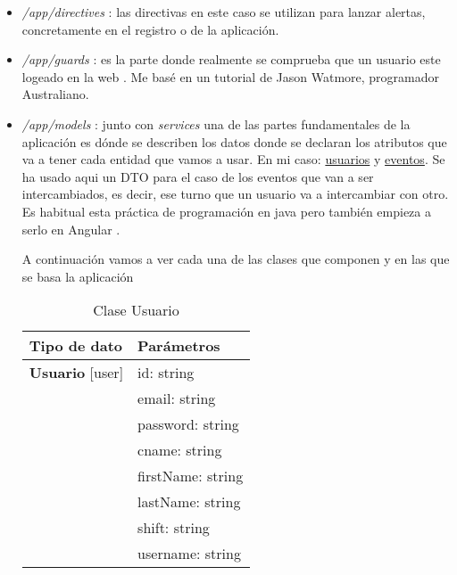 \begin{itemize}

	\item \emph{/app/directives} : las directivas  en este caso se utilizan para lanzar alertas, concretamente en el registro o  de la aplicación. 
	
	\item \emph{/app/guards} : es la parte donde realmente se comprueba que un usuario este logeado en la web \cite{guards}. Me basé en un tutorial \cite{logintut} de Jason Watmore, programador Australiano. 
	
	\item \emph{/app/models} : junto con \emph{services} una de las partes fundamentales de la aplicación es dónde se describen los datos donde se declaran los atributos que va a tener cada entidad que vamos a usar. En mi caso: \underline{usuarios} y \underline{eventos}.  
	Se ha usado aqui un DTO \cite{dto} para el caso de los eventos que van a ser intercambiados, es decir, ese turno que un usuario va a intercambiar con otro. Es habitual esta práctica de programación en java pero también empieza a serlo en Angular \cite{dto2}.
	
	A continuación vamos a ver cada una de las clases que componen y en las que se basa la aplicación
	
\begin{table}[H]
\centering
\begin{tabular}{|l|l|}
\hline
Tipo de dato & Parámetros  \\
\hline \hline
\textbf{Usuario} [user] & id: string \\ 
    & email: string \\
    & password: string \\
    & cname: string \\
    & firstName: string \\
    & lastName: string \\
    & shift: string \\
    & username: string \\ \hline
\end{tabular}
\caption{Clase Usuario}
\end{table}




\end{itemize}
